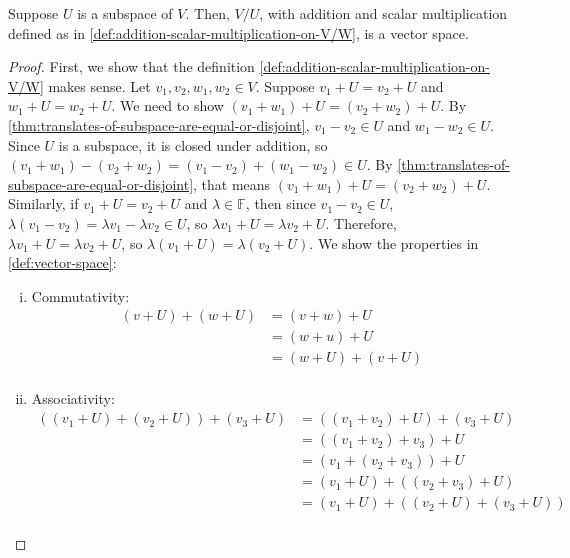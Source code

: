 \documentclass{article}
\begin{document}
\begin{theorem}
  \label{thm:quotient-space-is-vector-space}
  Suppose $U$ is a subspace of $V$. Then, $V/U$, with addition and
  scalar multiplication defined as in
  \cref{def:addition-scalar-multiplication-on-V/W}, is a vector space.
\end{theorem}
\begin{proof}
  First, we show that the definition
  \cref{def:addition-scalar-multiplication-on-V/W} makes sense. Let
  $v_1, v_2, w_1, w_2 \in V$. Suppose $v_1 + U = v_2 + U$ and $w_1 + U
  = w_2 + U$. We need to show $(v_1 + w_1) + U = (v_2 + w_2) + U$. By
  \cref{thm:translates-of-subspace-are-equal-or-disjoint}, $v_1 - v_2
  \in U$ and $w_1 - w_2 \in U$. Since $U$ is a subspace, it is closed
  under addition, so $(v_1 + w_1) - (v_2 + w_2) = (v_1 - v_2) + (w_1 -
  w_2) \in U$. By
  \cref{thm:translates-of-subspace-are-equal-or-disjoint}, that means
  $(v_1 + w_1) + U = (v_2 + w_2) + U$. Similarly, if $v_1 + U = v_2 +
  U$ and $\lambda \in \mathbb{F}$, then since $v_1 - v_2 \in U$,
  $\lambda(v_1 - v_2) = \lambda v_1 - \lambda v_2 \in U$, so $\lambda
  v_1 + U = \lambda v_2 + U$. Therefore, $\lambda v_1 + U = \lambda
  v_2 + U$, so $\lambda (v_1 + U) = \lambda (v_2 + U)$. 
  We show the properties in \cref{def:vector-space}:
  \begin{enumerate}[(i)]
  \item Commutativity:
    \begin{align*}
      (v + U) + (w + U) &= (v + w) + U  \\
                        &= (w + u) + U \\
                        &= (w + U) + (v + U) \\
    \end{align*}
  \item Associativity:
    \begin{align*}
      ((v_1 + U) + (v_2 + U)) + (v_3 + U) &= ((v_1 + v_2) + U) + (v_3
                                            + U) \\
                                          &= ((v_1 + v_2) + v_3) + U \\
                                          &= (v_1 + (v_2 + v_3)) + U \\
                                          &= (v_1 + U) + ((v_2 + v_3) + U) \\
                                          &= (v_1 + U) + ((v_2 + U) + (v_3 + U)) \\
    \end{align*}

\end{enumerate}
\end{proof}
\end{document}
